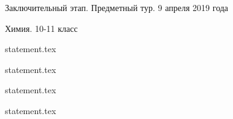 \documentclass[a4paper,11pt, oneside]{book}
\begin{document}
\vspace{-3mm}
\vspace{-5mm}

\normalsize

\begin{center}
    Заключительный этап. Предметный тур. 9 апреля 2019 года
    
    Химия. 10-11 класс
\end{center}

\parindent=0cm

{statement.tex}

\clearpage

{statement.tex}

\clearpage

{statement.tex}


{statement.tex}
\end{document}

